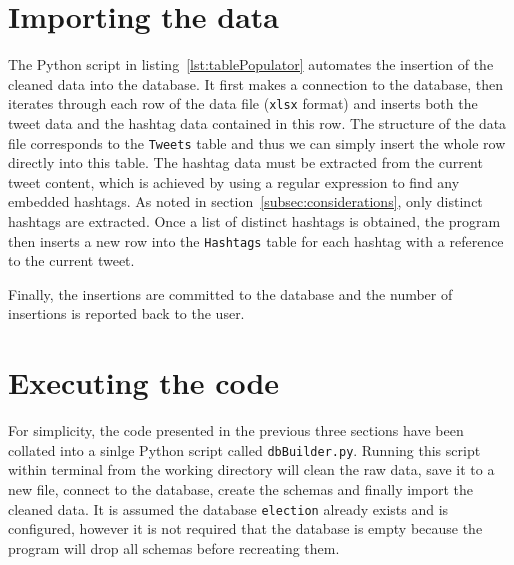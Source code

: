 \documentclass[a4paper, 12pt]{report}
\begin{document}

\label{lst:dataCleaner}

\newpage
\section{Importing the data}
\label{sec:dataImporting}

The Python script in listing~\ref{lst:tablePopulator} automates the insertion of the cleaned data into the database. It first makes a connection to the database, then iterates through each row of the data file (\texttt{xlsx} format) and inserts both the tweet data and the hashtag data contained in this row. The structure of the data file corresponds to the \texttt{Tweets} table and thus we can simply insert the whole row directly into this table. The hashtag data must be extracted from the current tweet content, which is achieved by using a regular expression to find any embedded hashtags. As noted in section~\ref{subsec:considerations}, only distinct hashtags are extracted. Once a list of distinct hashtags is obtained, the program then inserts a new row into the \texttt{Hashtags} table for each hashtag with a reference to the current tweet.

Finally, the insertions are committed to the database and the number of insertions is reported back to the user.


\label{lst:tablePopulator}

\newpage
\section{Executing the code}

For simplicity, the code presented in the previous three sections have been collated into a sinlge Python script called \texttt{dbBuilder.py}. Running this script within terminal from the working directory will clean the raw data, save it to a new file, connect to the database, create the schemas and finally import the cleaned data. It is assumed the database \texttt{election} already exists and is configured, however it is not required that the database is empty because the program will drop all schemas before recreating them.
\end{document}
